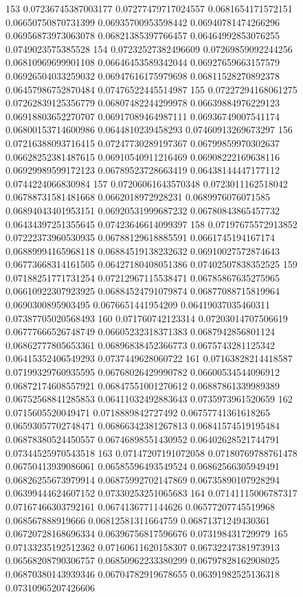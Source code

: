 153 0.07236745387003177 0.07277479717024557 0.0681654171572151 0.06650750870731399 0.06935700953598442 0.06940781474266296 0.06956873973063078 0.06821385397766457 0.06464992853076255 0.0749023575385528
154 0.07232527382496609 0.07269859092244256 0.06810969699901108 0.06646453589342044 0.06927659663157579 0.06926504033259032 0.06947616175979698 0.06811528270892378 0.06457986752870484 0.07476522445514987
155 0.07227294168061275 0.07262839125356779 0.06807482244299978 0.06639884976229123 0.06918803652270707 0.06917089464987111 0.06936749007541174 0.06800153714600986 0.0644810239458293 0.07460913269673297
156 0.07216388093716415 0.07247730289197367 0.06799859970302637 0.06628252381487615 0.06910540911216469 0.06908222169638116 0.06929989599172123 0.06789523728663419 0.06438144447177112 0.0744224066830984
157 0.07206061643570348 0.0723011162518042 0.06788731581481668 0.0662018972928231 0.0689976076071585 0.06894043401953151 0.06920531999687232 0.06780843865457732 0.06434397251355645 0.07423646614099397
158 0.07197675572913852 0.07222373960530935 0.06788129618885591 0.0661745194167174 0.06889994165968118 0.06884519138232632 0.06910027572874643 0.06773668314161505 0.06427180408051386 0.07402507838352525
159 0.07188251771731254 0.07212967115538471 0.06785867635275965 0.06610922307923925 0.06884524791079874 0.06877088715819964 0.0690300895903495 0.0676651441954209 0.06419037035460311 0.07387705020568493
160 0.071760742123314 0.07203014707506619 0.06777666526748749 0.06605232318371383 0.0687942856801124 0.06862777805653361 0.06896838452366773 0.0675743281125342 0.06415352406549293 0.0737449628060722
161 0.07163828214418587 0.07199329760935595 0.06768026429990782 0.06600534544096912 0.06872174608557921 0.06847551001270612 0.06887861339989389 0.06752568841285853 0.06411032492883643 0.0735973961520659
162 0.0715605520049471 0.0718889842727492 0.06757741361618265 0.06593057702748471 0.06866342381267813 0.06841574519195484 0.06878380524450557 0.06746898551430952 0.06402628521744791 0.07344525970543518
163 0.07147207191072058 0.07180769788761478 0.06750413939086061 0.06585596493549524 0.06862566305949491 0.06826255673979914 0.06875992702147869 0.06735890107928294 0.06399444624607152 0.07330253251065683
164 0.07141115006787317 0.07167466303792161 0.0674136771144626 0.06577207745519968 0.068567888919666 0.06812581311664759 0.06871371249430361 0.06720728168696334 0.06396756817596676 0.073198431729979
165 0.07133235192512362 0.07160611620158307 0.06732247381973913 0.06568208790306757 0.06850962233380299 0.06797828162908025 0.06870380143939346 0.06704782919678655 0.06391982525136318 0.07310965207426606

